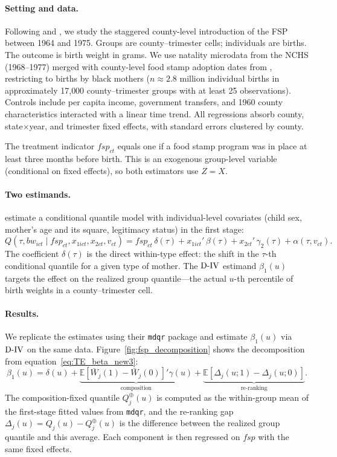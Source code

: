 \documentclass[12pt]{article}
\newcommand{\E}{\mathbb{E}}
\newcommand{\est}{\ensuremath{\textnormal{D-IV}}\xspace}
\begin{document}
\paragraph{Setting and data.}
Following \citet{almond2011inside} and \citet{melly2025minimum}, we study the staggered county-level introduction of the FSP between 1964 and 1975. Groups are county--trimester cells; individuals are births. The outcome is birth weight in grams. We use natality microdata from the NCHS (1968--1977) merged with county-level food stamp adoption dates from \citet{almond2011inside}, restricting to births by black mothers ($n \approx 2.8$ million individual births in approximately 17{,}000 county--trimester groups with at least 25 observations). Controls include per capita income, government transfers, and 1960 county characteristics interacted with a linear time trend. All regressions absorb county, state$\times$year, and trimester fixed effects, with standard errors clustered by county.

The treatment indicator $\mathit{fsp}_{ct}$ equals one if a food stamp program was in place at least three months before birth. This is an exogenous group-level variable (conditional on fixed effects), so both estimators use $Z = X$.

\paragraph{Two estimands.}
\citeauthor{melly2025minimum} estimate a conditional quantile model with individual-level covariates (child sex, mother's age and its square, legitimacy status) in the first stage:
\begin{equation}\label{eq:mp_model}
Q(\tau, \mathit{bw}_{ict} \mid \mathit{fsp}_{ct}, x_{1ict}, x_{2ct}, v_{ct}) = \mathit{fsp}_{ct}\, \delta(\tau) + x_{1ict}'\, \beta(\tau) + x_{2ct}'\,\gamma_2(\tau) + \alpha(\tau, v_{ct}).
\end{equation}
The coefficient $\delta(\tau)$ is the direct within-type effect: the shift in the $\tau$-th conditional quantile for a given type of mother. The \est estimand $\beta_1(u)$ targets the effect on the realized group quantile---the actual $u$-th percentile of birth weights in a county--trimester cell.

\paragraph{Results.}
We replicate the \citeauthor{melly2025minimum} estimates using their \texttt{mdqr} package \citep{mdqr} and estimate $\beta_1(u)$ via \est on the same data. Figure~\ref{fig:fsp_decomposition} shows the decomposition from equation~\eqref{eq:TE_beta_new3}:
\[
\beta_1(u) = \delta(u) + \underbrace{\E[\bar W_j(1) - \bar W_j(0)]'\gamma(u)}_{\text{composition}} + \underbrace{\E[\Delta_j(u;1) - \Delta_j(u;0)]}_{\text{re-ranking}}.
\]
The composition-fixed quantile $Q_j^{\oplus}(u)$ is computed as the within-group mean of the first-stage fitted values from \texttt{mdqr}, and the re-ranking gap $\Delta_j(u) = Q_j(u) - Q_j^{\oplus}(u)$ is the difference between the realized group quantile and this average. Each component is then regressed on $\mathit{fsp}$ with the same fixed effects.
\end{document}
